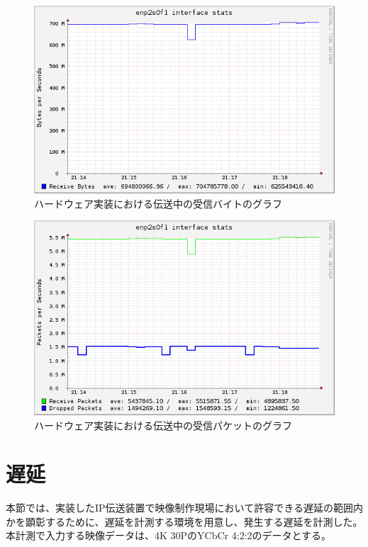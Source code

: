 \begin{figure}[htbp]
  \begin{center}
    \includegraphics[bb=0 0 597 374,width=11.8cm]{img/enp2s0f1-bytes-graph.png}
  \end{center}
  \caption{ハードウェア実装における伝送中の受信バイトのグラフ}
  \label{fig:enp2s0f1-bytes-graph}
\end{figure}

\begin{figure}[htbp]
  \begin{center}
    \includegraphics[bb=0 0 597 388,width=11.8cm]{img/enp2s0f1-packets-graph.png}
  \end{center}
  \caption{ハードウェア実装における伝送中の受信パケットのグラフ}
  \label{fig:enp2s0f1-packets-graph}
\end{figure}


\newpage
\section{遅延}

本節では、実装したIP伝送装置で映像制作現場において許容できる遅延の範囲内かを顕彰するために、遅延を計測する環境を用意し、発生する遅延を計測した。
本計測で入力する映像データは、4K 30PのYCbCr 4:2:2のデータとする。

